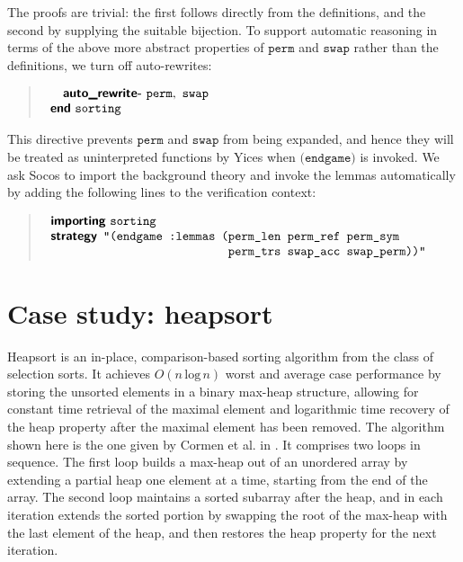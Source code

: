 \documentclass[english,submission]{eptcs}
\begin{document}
\noindent The proofs are trivial: the first follows directly
from the definitions, and the second by supplying the suitable bijection.
To support automatic reasoning in terms of the above more
abstract properties of $\mathtt{perm}$ and $\mathtt{swap}$ rather
than the definitions, we turn off auto-rewrites:
\begin{quote}
$\begin{array}[t]{l}
\quad\textsf{\textbf{auto\_rewrite-}}\ \mathtt{perm,\ swap}\\
\textsf{\textbf{end}}\ \mathtt{sorting}
\end{array}$
\end{quote}
\noindent This directive prevents $\mathtt{perm}$ and $\mathtt{swap}$
from being expanded, and hence they will be treated as uninterpreted
functions by Yices when $\texttt{(endgame)}$ is invoked. We ask Socos
to import the background theory and invoke the lemmas automatically
by adding the following lines to the verification context:
\begin{quote}
\noindent $\begin{array}[t]{l}
\textsf{\textbf{importing}}\ \mathtt{sorting}\\
\textsf{\textbf{strategy}}\begin{array}[t]{l}
\texttt{"(endgame :lemmas}\begin{array}[t]{l}
\texttt{(}\texttt{perm\_len perm\_ref perm\_sym}\\
\texttt{ perm\_trs swap\_acc swap\_perm))"}
\end{array}\end{array}
\end{array}$
\end{quote}

\section{Case study: heapsort\label{sec:Example:Heapsort}}

Heapsort is an in-place, comparison-based
sorting algorithm from the class of selection sorts. It achieves $O(n\,\text{log}\, n)$
worst and average case performance by storing the unsorted elements
in a binary max-heap structure, allowing for constant time retrieval
of the maximal element and logarithmic time recovery of the heap property
after the maximal element has been removed. The algorithm shown here
is the one given by Cormen et al. in \cite[Ch. 6]{580470}. It comprises
two loops in sequence. The first loop builds a max-heap out of an
unordered array by extending a partial heap one element at a time,
starting from the end of the array. The second loop maintains a sorted
subarray after the heap, and in each iteration extends the sorted
portion by swapping the root of the max-heap with the last element
of the heap, and then restores the heap property for the next iteration.
\end{document}
